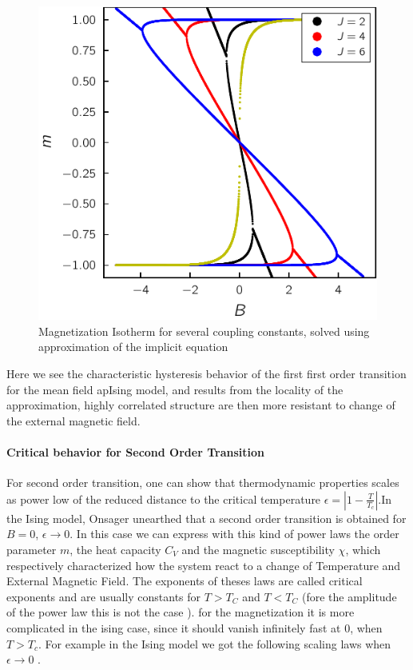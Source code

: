 \documentclass[ansiapaper]{report}
\begin{document}
\begin{multicols}{3}
\begin{figure}[H]
    \begin{center}
        \includegraphics[width=1\linewidth]{figures/magnetization_mfa.pdf}
    \end{center}
    \caption{Magnetization Isotherm for several coupling constants, solved using approximation of the implicit equation}\label{fig:mfa}
\end{figure}

Here we see the characteristic hysteresis behavior of the first first order transition for the mean field apIsing model, and results from the locality of the approximation, highly correlated structure are then more resistant to change of the external magnetic field. 

\paragraph*{Critical behavior for Second Order Transition}

For second order transition, one can show that thermodynamic properties scales as power low of the reduced distance to the critical temperature $\epsilon = |1 - \frac{T}{T_c}|$.In the Ising model, Onsager unearthed that a second order transition is obtained for $B =0$, $\epsilon \to 0$. In this case we can express with this kind of power laws the order parameter $m$, the heat capacity $C_V$ and the magnetic susceptibility $\chi$, which respectively characterized how the system react to a change of Temperature and External Magnetic Field. The exponents of theses laws are called critical exponents and are usually constants for $T>T_C$ and $T < T_C$ (fore the amplitude of the power law this is not the case \cite{Landau}). for the magnetization it is more complicated in the ising case, since it should vanish infinitely fast  at 0, when $T  > T_c$. For example in the Ising model we got the following scaling laws when $ \epsilon \to 0$ \cite{power}. 


\end{multicols}
\end{document}
